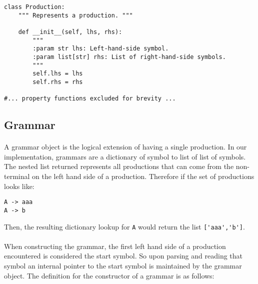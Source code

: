 \documentclass{article}
\begin{document}
\begin{verbatim}
class Production:
    """ Represents a production. """

    def __init__(self, lhs, rhs):
        """
        :param str lhs: Left-hand-side symbol.
        :param list[str] rhs: List of right-hand-side symbols.
        """
        self.lhs = lhs
        self.rhs = rhs

#... property functions excluded for brevity ... 
\end{verbatim}
\label{exerpt:production}

\subsection{Grammar}
\paragraph{} A grammar object is the logical extension of having a
single production. In our implementation, grammars are a dictionary
of symbol to list of list of symbols. The nested list returned represents
all productions that can come from the non-terminal on the left hand side
of a production. Therefore if the set of productions looks like:
\begin{verbatim}
A -> aaa
A -> b
\end{verbatim}
Then, the resulting dictionary lookup for \verb_A_ would return the list \verb_['aaa','b']_. 
\paragraph{} When constructing the grammar, the first left hand side of a production encountered is considered the start symbol. So upon parsing and reading that symbol an internal pointer to the start symbol is maintained by the grammar object. The definition for the constructor of a grammar is as follows:
\end{document}
